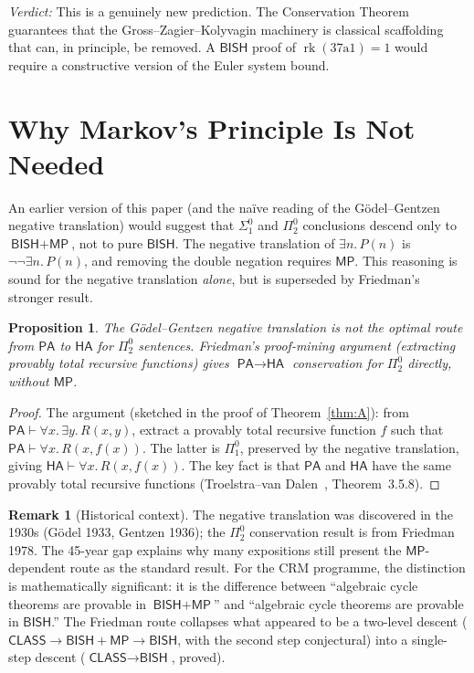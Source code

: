 \documentclass[11pt,a4paper]{article}
\theoremstyle{plain}
\newtheorem{proposition}[theorem]{Proposition}
\theoremstyle{definition}
\newtheorem{remark}[theorem]{Remark}
\newcommand{\BISH}{\textsf{BISH}}
\newcommand{\MP}{\textsf{MP}}
\newcommand{\CLASS}{\textsf{CLASS}}
\newcommand{\HA}{\textsf{HA}}
\newcommand{\PA}{\textsf{PA}}
\DeclareMathOperator{\rk}{rk}
\begin{document}
\emph{Verdict:} This is a genuinely new prediction.  The Conservation Theorem guarantees that the Gross--Zagier--Kolyvagin machinery is classical scaffolding that can, in principle, be removed.  A $\BISH$ proof of $\rk(37\mathrm{a}1) = 1$ would require a constructive version of the Euler system bound.


\section{Why Markov's Principle Is Not Needed}\label{sec:mp}

An earlier version of this paper (and the na\"ive reading of the G\"odel--Gentzen negative translation) would suggest that $\Sigma^0_1$ and $\Pi^0_2$ conclusions descend only to $\BISH + \MP$, not to pure $\BISH$.  The negative translation of $\exists n.\, P(n)$ is $\lnot\lnot\exists n.\, P(n)$, and removing the double negation requires $\MP$.  This reasoning is sound for the negative translation \emph{alone}, but is superseded by Friedman's stronger result.

\begin{proposition}\label{prop:mp-not-needed}
The G\"odel--Gentzen negative translation is \emph{not} the optimal route from $\PA$ to $\HA$ for $\Pi^0_2$ sentences.  Friedman's proof-mining argument (extracting provably total recursive functions) gives $\PA \to \HA$ conservation for $\Pi^0_2$ directly, without $\MP$.
\end{proposition}

\begin{proof}
The argument (sketched in the proof of Theorem~\ref{thm:A}): from $\PA \vdash \forall x.\, \exists y.\, R(x,y)$, extract a provably total recursive function $f$ such that $\PA \vdash \forall x.\, R(x, f(x))$.  The latter is $\Pi^0_1$, preserved by the negative translation, giving $\HA \vdash \forall x.\, R(x, f(x))$.  The key fact is that $\PA$ and $\HA$ have the same provably total recursive functions (Troelstra--van Dalen~\cite{troelstra-vandalen1988}, Theorem~3.5.8).
\end{proof}

\begin{remark}[Historical context]
The negative translation was discovered in the 1930s (G\"odel 1933, Gentzen 1936); the $\Pi^0_2$ conservation result is from Friedman 1978.  The 45-year gap explains why many expositions still present the $\MP$-dependent route as the standard result.  For the CRM programme, the distinction is mathematically significant: it is the difference between ``algebraic cycle theorems are provable in $\BISH + \MP$'' and ``algebraic cycle theorems are provable in $\BISH$.''  The Friedman route collapses what appeared to be a two-level descent ($\CLASS \to \BISH + \MP \to \BISH$, with the second step conjectural) into a single-step descent ($\CLASS \to \BISH$, proved).
\end{remark}
\end{document}
